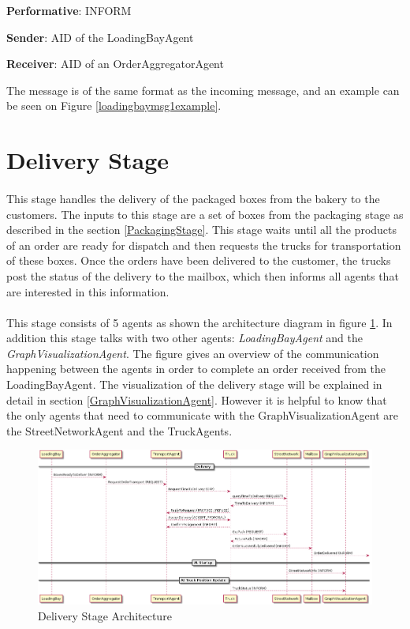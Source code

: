 \documentclass[11pt, a4paper]{article}
\begin{document}
\begin{enumerate}
	\textbf{Performative}: INFORM
	
	\textbf{Sender}: AID of the LoadingBayAgent
	
	\textbf{Receiver}: AID of an OrderAggregatorAgent
	
	The message is of the same format as the incoming message, and an example can be seen on Figure \ref{loadingbaymsg1example}.
	
\end{enumerate}

\newpage
\section{Delivery Stage}\label{DeliveryStage}
\paragraph{}
This stage handles the delivery of the packaged boxes from the bakery to the customers. The inputs to this stage are a set of boxes from the packaging stage as described in the section \ref{PackagingStage}. This stage waits until all the products of an order are ready for dispatch and then requests the trucks for transportation of these boxes. Once the orders have been delivered to the customer, the trucks post the status of the delivery to the mailbox, which then informs all agents that are interested in this information.

\paragraph{}
This stage consists of 5 agents as shown the architecture diagram in figure \ref{DeliveryArchitecture}. In addition this stage talks with two other agents: \textit{LoadingBayAgent} and the \textit{GraphVisualizationAgent}. The figure gives an overview of the communication happening between the agents in order to complete an order received from the LoadingBayAgent. The visualization of the delivery stage will be explained in detail in section \ref{GraphVisualizationAgent}. However it is helpful to know that the only agents that need to communicate with the GraphVisualizationAgent are the StreetNetworkAgent and the TruckAgents. 

\begin{figure}[h!]
	\centering
	\includegraphics[width=\textwidth]{../Architecture/Architecture_Delivery.png}
	\caption{Delivery Stage Architecture}
	\label{DeliveryArchitecture}
\end{figure}
\end{document}
